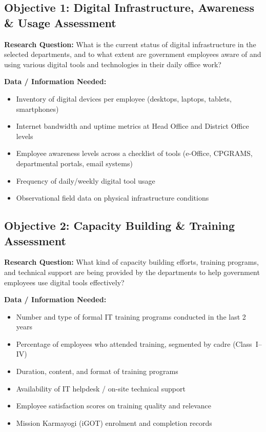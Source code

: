 \documentclass[12pt,a4paper]{article}
\begin{document}
\subsection{Objective 1: Digital Infrastructure, Awareness \& Usage Assessment}

\textbf{\color{accentblue}Research Question:} What is the current status of digital infrastructure in the selected departments, and to what extent are government employees aware of and using various digital tools and technologies in their daily office work?

\textbf{Data / Information Needed:}
\begin{itemize}[leftmargin=1.5em, itemsep=2pt]
    \item Inventory of digital devices per employee (desktops, laptops, tablets, smartphones)
    \item Internet bandwidth and uptime metrics at Head Office and District Office levels
    \item Employee awareness levels across a checklist of tools (e-Office, CPGRAMS, departmental portals, email systems)
    \item Frequency of daily/weekly digital tool usage
    \item Observational field data on physical infrastructure conditions
\end{itemize}

\subsection{Objective 2: Capacity Building \& Training Assessment}

\textbf{\color{accentgreen}Research Question:} What kind of capacity building efforts, training programs, and technical support are being provided by the departments to help government employees use digital tools effectively?

\textbf{Data / Information Needed:}
\begin{itemize}[leftmargin=1.5em, itemsep=2pt]
    \item Number and type of formal IT training programs conducted in the last 2 years
    \item Percentage of employees who attended training, segmented by cadre (Class~I--IV)
    \item Duration, content, and format of training programs
    \item Availability of IT helpdesk / on-site technical support
    \item Employee satisfaction scores on training quality and relevance
    \item Mission Karmayogi (iGOT) enrolment and completion records
\end{itemize}
\end{document}
